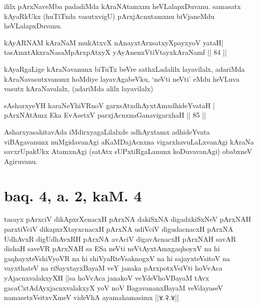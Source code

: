 \begin{artha}
ililx pArxNaveMba padadiMda kAraNAtamxnu heVLalapxDuvanu. samasatx kAyaRkUkx (huTiTxda vasutxvigU) pArxjAcnxtamxnu biVjaneMdu heVLalapxDuvanu.
\end{artha}


\begin{shl}
kAyARNAM kAraNaM mukAtxvX nAnayxtArxsatxyXpayxyoV yataH|\\
tasAmxtAkxraNasaMpArxpAtxyX yAyAnenxVtiVtayxkAraNamf \hfill || 84 || 
\end{shl}

\begin{artha}
kAyaRgaLige kAraNavanunx biTuTx beVre sathxLadalilx layavilalx, adariMda kAraNavasutxvanunx hoMdiye layavAgabeVku, `neVti neVti' eMdu heVLuva vasutx kAraNavalalx, (adariMda alilx layavilalx)
\end{artha}


\begin{shl}
sAsharxyeYH karaNeYhiVRnoV garxsAtxdhAyxtAmxdhideYvataH |\\
pArxNAtAmx Eka EvA\s \s setxV parxjAcnxnaGanavigarxhaH \hfill || 85 || 
\end{shl}

\begin{artha}
AsharxyasahitavAda iMdirxyagaLilalxde adhAyxtamx adhideYvata viBAgavanunx nuMgidavanAgi aKaMDajAcnxna vigarxhavuLaLxvanAgi kAraNa savxrUpakUkx AtamxnAgi (satAtx sUPxtiRgaLanunx koDuvavanAgi) obabxneV Agiruvanu.
\end{artha}

\section*{baq. 4, a. 2, kaM. 4}

\begin{shl}
tasayx pArxciV dikApxrXcnacxH pArxNA dakiSxNA digadxkiSxNeV pArxNAH parxtiVciV dikapxrXtayxcnacxH pArxNA udiVciV digudacnacxH pArxNA UdhAvxR digUdhAvxRH pArxNA avAciV digavAcnacxH pArxNAH savAR dishaH saveVR pArxNAH sa ESa neVti neVtAyxtAmxgaqhoyxV na hi gaqhayxteV\s shiVyoVR na hi shiVyaRteV\s saknogxV na hi sajayxteV\s sitoV na vayxthateV na riSayxtayxBayaM veY janaka pArxpotxV\s siVti hoVvAca yAjacnxvalakxyXH ||sa hoVvAca janakoV veYdeVhoV\s BayaM tAvx gacaCxtAdAyxjacnxvalakxyX yoV noV BagavananxBayaM veVdayaseV namasetxV\s sitxvXmeV videVhA ayamahamasimx ||४.२.४||
\end{shl}

